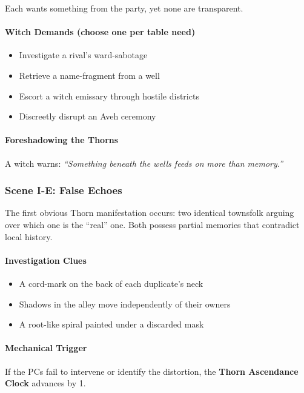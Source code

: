 \documentclass[11pt]{book}
\begin{document}
Each wants something from the party, yet none are transparent.

\paragraph{Witch Demands (choose one per table need)}
\begin{itemize}[leftmargin=*]
    \item Investigate a rival's ward-sabotage
    \item Retrieve a name-fragment from a well
    \item Escort a witch emissary through hostile districts
    \item Discreetly disrupt an Aveh ceremony
\end{itemize}

\paragraph{Foreshadowing the Thorns}
A witch warns:  
\emph{``Something beneath the wells feeds on more than memory.''}

\vspace{1em}

\subsubsection*{Scene I-E: False Echoes}

The first obvious Thorn manifestation occurs:
two identical townsfolk arguing over which one is the ``real'' one.
Both possess partial memories that contradict local history.

\paragraph{Investigation Clues}
\begin{itemize}[leftmargin=*]
    \item A cord-mark on the back of each duplicate's neck  
    \item Shadows in the alley move independently of their owners  
    \item A root-like spiral painted under a discarded mask  
\end{itemize}

\paragraph{Mechanical Trigger}
If the PCs fail to intervene or identify the distortion,  
the \textbf{Thorn Ascendance Clock} advances by 1.
\end{document}
